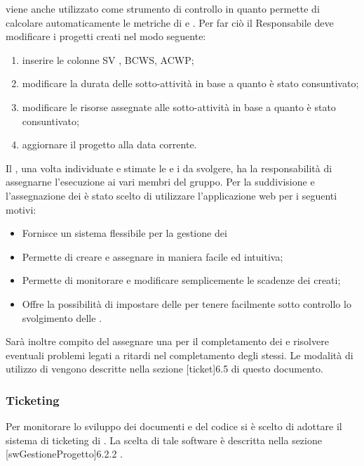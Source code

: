 \documentclass[12pt,a4paper]{article}
\begin{document}
 viene anche utilizzato come strumento di controllo in quanto permette di calcolare automaticamente le metriche di \textit{} e \textit{}. Per far ciò il Responsabile deve modificare i progetti creati nel modo seguente:
\begin{enumerate}
	\item inserire le colonne SV , BCWS, ACWP;
	\item modificare la durata delle sotto-attività in base a quanto è stato consuntivato;
	\item modificare le risorse assegnate alle sotto-attività in base a quanto è stato consuntivato;
	\item aggiornare il progetto alla data corrente.
\end{enumerate}

\label{swGestioneProgetto}
Il \PM{}, una volta individuate e stimate le  e i \textit{} da svolgere, ha la responsabilità di assegnarne l'esecuzione ai vari membri del gruppo. Per la suddivisione e l'assegnazione dei \textit{} è stato scelto di utilizzare l'applicazione web  per i seguenti motivi: 
\begin{itemize}
	\item Fornisce un sistema flessibile per la gestione dei \textit{}
	\item Permette di creare e assegnare \textit{} in maniera facile ed intuitiva; 
	\item Permette di monitorare e modificare semplicemente le scadenze dei \textit{} creati;
	\item Offre la possibilità di impostare delle \textit{} per tenere facilmente sotto controllo lo svolgimento delle .
\end{itemize}
Sarà inoltre compito del \PM{} assegnare una \textit{} per il completamento dei \textit{} e risolvere eventuali problemi legati a ritardi nel completamento degli stessi.
Le modalità di utilizzo di \textit{} vengono descritte nella sezione [ticket]{6.5} di questo documento.

\subsubsection{Ticketing}\label{ticket} %
Per monitorare lo sviluppo dei documenti e del codice si è scelto di adottare il sistema di ticketing di \textit{}. La scelta di tale software è descritta nella sezione [swGestioneProgetto]{6.2.2} .
\end{document}

